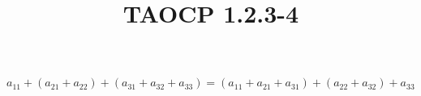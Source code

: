 \documentclass{article}
\title{TAOCP 1.2.3\mbox{-}4}
\begin{document}
\maketitle

\( a_{11} + (a_{21} + a_{22}) + (a_{31} + a_{32} + a_{33}) = (a_{11} + a_{21} + a_{31}) + (a_{22} + a_{32}) + a_{33} \)
\end{document}
